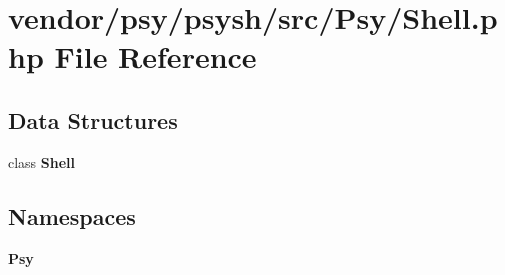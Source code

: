 \section{vendor/psy/psysh/src/\+Psy/\+Shell.php File Reference}
\label{psy_2psysh_2src_2_psy_2_shell_8php}
\subsection*{Data Structures}
\begin{DoxyCompactItemize}
\item 
class {\bf Shell}
\end{DoxyCompactItemize}
\subsection*{Namespaces}
\begin{DoxyCompactItemize}
\item 
 {\bf Psy}
\end{DoxyCompactItemize}
